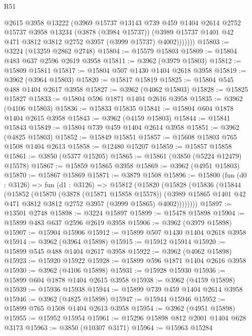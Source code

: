 \begin{lexlean}{R51}
\begin{coremodule}
              @2615
              @3958
              @13222
              (@3969
                @15737
                @13143
                @739
                @459
                @1404
                @2614
                @2752
                @15737
                @3958
                @13234
                (@3878 (@3984 @15737))
                (@3989 @15737 @1401 @42 @471 @3812 @3812 @2752 @3957 (@3999 @15737) @4002)))))))
@15803 := @3224 (@13259 @2862 @2748)
@15804 := @15579 @15803
@15809 := @15804 @483 @637 @2596 @2619 @3958
@15811 := @3962 (@3979 @15803)
@15812 := @15809 @15811
@15817 := @15804 @507 @1430 @1404 @2618 @3958
@15819 := @3962 (@3964 @15803)
@15820 := @15817 @15819
@15825 := @15804 @545 @488 @1404 @2617 @3958
@15827 := @3962 (@4062 @15803)
@15828 := @15825 @15827
@15833 := @15804 @596 @1871 @1404 @2616 @3958
@15835 := @3962 (@4106 @15803)
@15836 := @15833 @15835
@15841 := @15804 @604 @1878 @1404 @2615 @3958
@15843 := @3962 (@4159 @15803)
@15844 := @15841 @15843
@15849 := @15804 @739 @459 @1404 @2614 @3958
@15851 := @3962 (@4825 @15803)
@15852 := @15849 @15851
@15857 := @15608 @15803 @765 @1508 @1404 @2613
@15858 := @12480 @15207
@15859 := @15857 @15858
@15861 := @3850 (@5377 @15205)
@15865 := @15861 (@3850 (@5224 @12479) @15578)
@15867 := @15859 @15865 @3958
@15869 := @3962 (@4951 @15803)
@15870 := @15867 @15869
@15871 := @3879 @1508
@15896 := @15800
    (fun (d0 : @3126) =>
    fun (d1 : @3126) =>
    @15812
      (@15820
        (@15828
          (@15836
            (@15844
              (@15852
                (@15870
                  (@3878 (@15871 @15858 @15578))
                  (@3989 @15865 @1401 @42 @471 @3812 @3812 @2752 @3957 (@3999 @15865) @4002))))))))
@15897 := @13501 @2748
@15898 := @3224 @15897
@15899 := @15478 @15898
@15904 := @15899 @483 @637 @2596 @2619 @3958
@15906 := @3962 (@3979 @15898)
@15907 := @15904 @15906
@15912 := @15899 @507 @1430 @1404 @2618 @3958
@15914 := @3962 (@3964 @15898)
@15915 := @15912 @15914
@15920 := @15899 @545 @488 @1404 @2617 @3958
@15922 := @3962 (@4062 @15898)
@15923 := @15920 @15922
@15928 := @15899 @596 @1871 @1404 @2616 @3958
@15930 := @3962 (@4106 @15898)
@15931 := @15928 @15930
@15936 := @15899 @604 @1878 @1404 @2615 @3958
@15938 := @3962 (@4159 @15898)
@15939 := @15936 @15938
@15944 := @15899 @739 @459 @1404 @2614 @3958
@15946 := @3962 (@4825 @15898)
@15947 := @15944 @15946
@15952 := @15899 @765 @1508 @1404 @2613 @3958
@15954 := @3962 (@4951 @15898)
@15955 := @15952 @15954
@15961 := @15296 @15898 @812 @2001 @1404 @628 @3173
@15963 := @3850 (@10307 @3171)
@15964 := @15963 @15284

\end{coremodule}
\end{lexlean}
